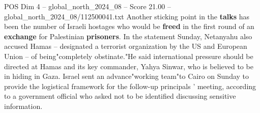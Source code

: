 \begin{textsample}{POS Dim 4 – global\_north\_2024\_08 – Score 21.00 – global\_north\_2024\_08/112500041.txt}
Another sticking point in the \textbf{talks} has been the number of Israeli hostages who would be \textbf{freed} in the first round of an \textbf{exchange} for Palestinian \textbf{prisoners}.
In the statement Sunday, Netanyahu also accused Hamas -- designated a terrorist organization by the US and European Union -- of being"completely obstinate."He said international pressure should be directed at Hamas and its key commander, Yahya Sinwar, who is believed to be in hiding in Gaza.
Israel sent an advance"working team"to Cairo on Sunday to provide the logistical framework for the follow-up principals ' meeting, according to a government official who asked not to be identified discussing sensitive information.

\end{textsample}

